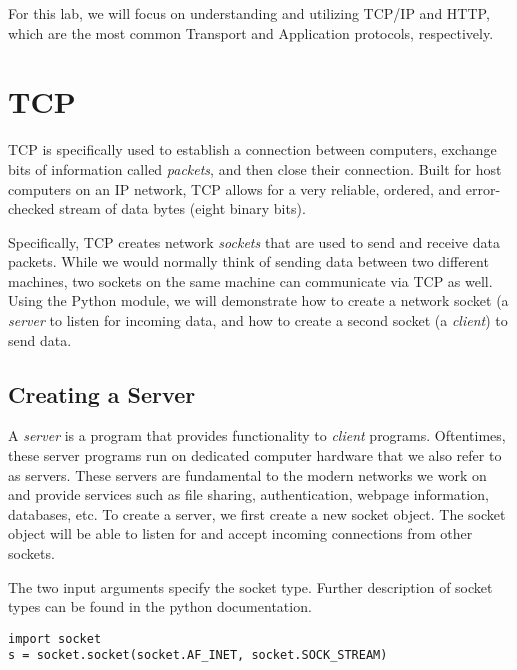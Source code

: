 For this lab, we will focus on understanding and utilizing TCP/IP and HTTP, which are the most common Transport and Application protocols, respectively.

\section*{TCP} %

TCP is specifically used to establish a connection between computers, exchange bits of information called \emph{packets}, and then close their connection.
Built for host computers on an IP network, TCP allows for a very reliable, ordered, and error-checked stream of data bytes (eight binary bits).

Specifically, TCP creates network \emph{sockets} that are used to send and receive data packets. While we would normally think of sending data between two different machines, two sockets on the same machine can communicate via TCP as well. Using the Python  module, we will demonstrate how to create a network socket (a \emph{server} to listen for incoming data, and how to create a second socket (a \emph{client}) to send data.

\subsection*{Creating a Server} %

A \emph{server} is a program that provides functionality to \emph{client} programs. Oftentimes, these server programs run on dedicated computer hardware that we also refer to as servers. These servers are fundamental to the modern networks we work on and provide services such as file sharing, authentication, webpage information, databases, etc.
To create a server, we first create a new socket object.
The socket object will be able to listen for and accept incoming connections from other sockets.

The two input arguments specify the socket type. Further description of socket types can be found in the python documentation.

\begin{lstlisting}
import socket
s = socket.socket(socket.AF_INET, socket.SOCK_STREAM)
\end{lstlisting}

